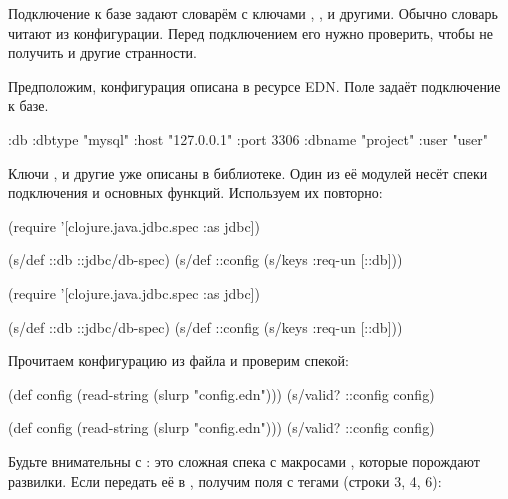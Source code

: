 Подключение к базе задают словарём с ключами , ,
 и другими. Обычно словарь читают из конфигурации. Перед
подключением его нужно проверить, чтобы не получить  и другие
странности.


Предположим, конфигурация описана в ресурсе EDN. Поле  задаёт
подключение к базе.



\begin{clojure}
{:db {:dbtype "mysql"
      :host "127.0.0.1"
      :port 3306
      :dbname "project"
      :user "user"}}
\end{clojure}


Ключи ,  и другие уже описаны в библиотеке. Один из её
модулей несёт спеки подключения и основных функций. Используем их повторно:

\ifnarrow


\begin{clojure}
(require
  '[clojure.java.jdbc.spec :as jdbc])

(s/def ::db ::jdbc/db-spec)
(s/def ::config (s/keys :req-un [::db]))
\end{clojure}


\else


\begin{clojure}
(require '[clojure.java.jdbc.spec :as jdbc])

(s/def ::db ::jdbc/db-spec)
(s/def ::config (s/keys :req-un [::db]))
\end{clojure}


\fi

\noindent
Прочитаем конфигурацию из файла и проверим спекой:

\ifnarrow


\begin{clojure}
(def config
  (read-string (slurp "config.edn")))
(s/valid? ::config config)
\end{clojure}


\else


\begin{clojure}
(def config (read-string (slurp "config.edn")))
(s/valid? ::config config)
\end{clojure}


\fi

\label{jdbc-conform-warning}


Будьте внимательны с : это сложная спека с макросами
, которые порождают развилки. Если передать её в
, получим поля с тегами (строки 3, 4, 6):


